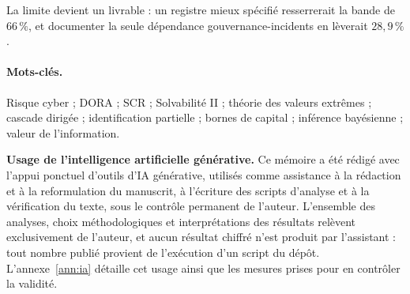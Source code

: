 La limite devient un livrable : un registre mieux spécifié resserrerait la bande de $66\,\%$, et
documenter la seule dépendance gouvernance-incidents en lèverait $28{,}9\,\%$.

\paragraph{Mots-clés.} Risque cyber ; DORA ; SCR ; Solvabilité II ; théorie des valeurs
extrêmes ; cascade dirigée ; identification partielle ; bornes de capital ; inférence
bayésienne ; valeur de l'information.

%
%
\bigskip
\noindent\textbf{Usage de l'intelligence artificielle générative.} Ce mémoire a été rédigé avec
l'appui ponctuel d'outils d'IA générative, utilisés comme assistance à la rédaction et à la reformulation du
manuscrit, à l'écriture des scripts d'analyse et à la vérification du texte, sous le contrôle
permanent de l'auteur. L'ensemble des analyses, choix méthodologiques et interprétations des
résultats relèvent exclusivement de l'auteur, et aucun résultat chiffré n'est produit par
l'assistant : tout nombre publié provient de l'exécution d'un script du dépôt. L'annexe~\ref{ann:ia}
détaille cet usage ainsi que les mesures prises pour en contrôler la validité.

